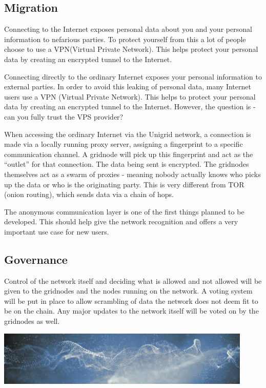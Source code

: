 \documentclass{article}
\begin{document}
\subsection{Migration}
Connecting to the Internet exposes personal data about you and your personal information to nefarious parties. To protect yourself from this a lot of people choose to use a VPN(Virtual Private Network). This helps protect your personal data by creating an encrypted tunnel to the Internet.

Connecting directly to the ordinary Internet exposes your personal information to external parties. In order to avoid this leaking of personal data, many Internet users use a VPN (Virtual Private Network). This helps to protect your personal data by creating an encrypted tunnel to the Internet. However, the question is - can you fully trust the VPS provider?

When accessing the ordinary Internet via the Unigrid network, a connection is made via a locally running proxy server, assigning a fingerprint to a specific communication channel. A gridnode will pick up this fingerprint and act as the “outlet” for that connection. The data being sent is encrypted. The gridnodes themselves act as a swarm of proxies - meaning nobody actually knows who picks up the data or who is the originating party. This is very different from TOR (onion routing), which sends data via a chain of hops.

The anonymous communication layer is one of the first things planned to be developed. This should help give the network recognition and offers a very important use case for new users.

\subsection{Governance}
Control of the network itself and deciding what is allowed and not allowed will be given to the gridnodes and the nodes running on the network. A voting system will be put in place to allow scrambling of data the network does not deem fit to be on the chain. Any major updates to the network itself will be voted on by the gridnodes as well.
\begin{mdframed}[style=textimage]
	\includegraphics[width=345pt]{abstract-particles}
\end{mdframed}
\end{document}
